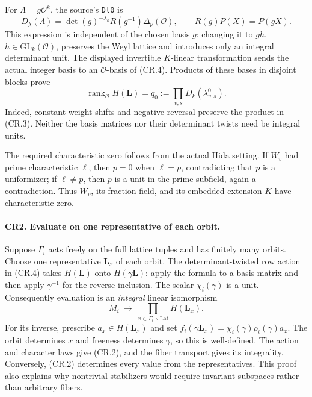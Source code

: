 \documentclass[11pt,a4paper]{article}
\numberwithin{equation}{section}
\theoremstyle{remark}\newtheorem{remark}[theorem]{Remark}
\begin{document}
For $\Lambda=g\mathcal O^k$, the source's \texttt{Dl0} is
\[
 D_\lambda(\Lambda)
   =\det(g)^{-\lambda_k}R(g^{-1})\Delta_\nu(\mathcal O),
       \qquad R(g)P(X)=P(gX).                            \tag{CR.4}
\]
This expression is independent of the chosen basis $g$:
changing it to $gh$, $h\in\mathrm{GL}_k(\mathcal O)$, preserves
the Weyl lattice and introduces only an integral determinant unit.
The displayed invertible $K$-linear transformation sends the actual
integer basis to an $\mathcal O$-basis of (CR.4).
Products of these bases in disjoint blocks prove
\[
 \operatorname{rank}_{\mathcal O}H(\mathbf L)
    =q_0:=\prod_{v,s}D_k(\lambda^0_{v,s}).                \tag{CR.5}
\]
Indeed, constant weight shifts and negative reversal preserve the
product in (CR.3). Neither the basis matrices nor their determinant
twists need be integral units.

The required characteristic zero follows from the actual Hida setting.
If $W_v$ had prime characteristic $\ell$, then $p=0$ when $\ell=p$,
contradicting that $p$ is a uniformizer; if $\ell\ne p$, then $p$ is a
unit in the prime subfield, again a contradiction. Thus $W_v$, its
fraction field, and its embedded extension $K$ have characteristic zero.

\paragraph{CR2. Evaluate on one representative of each orbit.}
Suppose $\Gamma_i$ acts freely on the full lattice tuples and has finitely
many orbits. Choose one representative $\mathbf L_x$ of each orbit.
The determinant-twisted row action in (CR.4) takes
$H(\mathbf L)$ onto $H(\gamma\mathbf L)$: apply the formula to a
basis matrix and then apply $\gamma^{-1}$ for the reverse inclusion.
The scalar $\chi_i(\gamma)$ is a unit. Consequently evaluation is an
\emph{integral} linear isomorphism
\[
 M_i\ \longrightarrow\ \prod_{x\in\Gamma_i\backslash\mathrm{Lat}}
                                  H(\mathbf L_x).       \tag{CR.6}
\]
For its inverse, prescribe $a_x\in H(\mathbf L_x)$ and set
$f_i(\gamma\mathbf L_x)=\chi_i(\gamma)\rho_i(\gamma)a_x$.
The orbit determines $x$ and freeness determines $\gamma$, so this
is well-defined. The action and character laws give (CR.2), and the
fiber transport gives its integrality. Conversely, (CR.2) determines
every value from the representatives. This proof also explains why
nontrivial stabilizers would require invariant subspaces rather than
arbitrary fibers.
\end{document}

